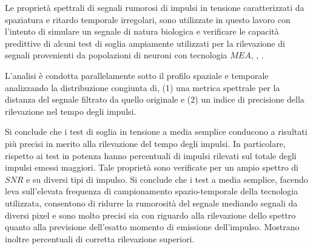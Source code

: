 \begin{ThesisTitlePage}
\end{ThesisTitlePage}
 

\summary

Le proprietà spettrali di segnali rumorosi di impulsi in tensione caratterizzati da spaziatura e ritardo temporale irregolari, sono utilizzate in questo lavoro con l'intento di simulare un segnale di natura biologica e verificare le capacità predittive di alcuni test di soglia ampiamente utilizzati per la rilevazione di segnali provenienti da popolazioni di neuroni con tecnologia $MEA$, \cite{Lambacher2011}, \cite{Vallicelli2017}. 

L'analisi è condotta parallelamente sotto il profilo spaziale e temporale analizzando la distribuzione congiunta di, (1) una metrica spettrale per la distanza del segnale filtrato da quello originale e (2) un indice di precisione della rilevazione nel tempo degli impulsi.

Si conclude che i test di soglia in tensione a media semplice conducono a risultati più precisi in merito alla rilevazione del tempo degli impulsi. In particolare, rispetto ai test in potenza hanno percentuali di impulsi rilevati sul totale degli impulsi emessi maggiori. Tale proprietà sono verificate per un ampio spettro di $SNR$ e su diversi tipi di impulso. Si conclude che i test a media semplice, facendo leva sull'elevata frequenza di campionamento spazio-temporale della tecnologia utilizzata, consentono di ridurre la rumorosità del segnale mediando segnali da diversi pixel e sono molto precisi sia con riguardo alla rilevazione dello spettro quanto alla previsione dell'esatto momento di emissione dell'impulso. Mostrano inoltre percentuali di corretta rilevazione superiori.



\emptypage %
% 
% 


